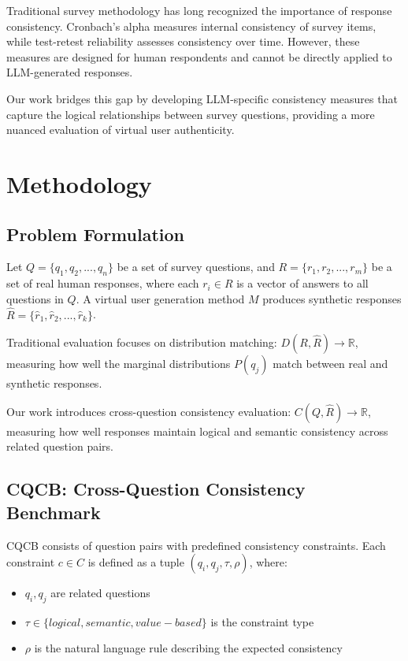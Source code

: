 \documentclass[sigconf, anonymous]{acmart}
\begin{document}
Traditional survey methodology has long recognized the importance of response consistency. Cronbach's alpha measures internal consistency of survey items, while test-retest reliability assesses consistency over time. However, these measures are designed for human respondents and cannot be directly applied to LLM-generated responses.

Our work bridges this gap by developing LLM-specific consistency measures that capture the logical relationships between survey questions, providing a more nuanced evaluation of virtual user authenticity.

\section{Methodology}

\subsection{Problem Formulation}

Let $Q = \{q_1, q_2, ..., q_n\}$ be a set of survey questions, and $R = \{r_1, r_2, ..., r_m\}$ be a set of real human responses, where each $r_i \in R$ is a vector of answers to all questions in $Q$. A virtual user generation method $M$ produces synthetic responses $\hat{R} = \{\hat{r}_1, \hat{r}_2, ..., \hat{r}_k\}$.

Traditional evaluation focuses on distribution matching: $D(R, \hat{R}) \rightarrow \mathbb{R}$, measuring how well the marginal distributions $P(q_j)$ match between real and synthetic responses.

Our work introduces cross-question consistency evaluation: $C(Q, \hat{R}) \rightarrow \mathbb{R}$, measuring how well responses maintain logical and semantic consistency across related question pairs.

\subsection{CQCB: Cross-Question Consistency Benchmark}

CQCB consists of question pairs with predefined consistency constraints. Each constraint $c \in C$ is defined as a tuple $(q_i, q_j, \tau, \rho)$, where:

\begin{itemize}
    \item $q_i, q_j$ are related questions
    \item $\tau \in \{logical, semantic, value-based\}$ is the constraint type
    \item $\rho$ is the natural language rule describing the expected consistency
\end{itemize}
\end{document}
